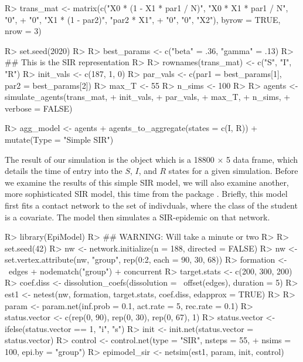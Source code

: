 \documentclass[
  shortnames]{jss}
\begin{document}
\begin{CodeChunk}
\begin{CodeInput}
R> trans_mat <- matrix(c("X0 * (1 - X1 * par1 / N)", "X0 * X1  * par1 / N", "0",
+                   "0", "X1 * (1 - par2)", "par2 * X1",
+                   "0", "0", "X2"), byrow = TRUE, nrow = 3)
\end{CodeInput}
\end{CodeChunk}

\begin{CodeChunk}
\begin{CodeInput}
R> set.seed(2020)
R> 
R> best_params <- c("beta" = .36, "gamma" = .13)
R> ## This is the SIR representation
R> 
R> rownames(trans_mat) <- c("S", "I", "R")
R> init_vals <- c(187, 1, 0)
R> par_vals <- c(par1 = best_params[1], par2 = best_params[2])
R> max_T <- 55
R> n_sims <- 100
R> 
R> agents <- simulate_agents(trans_mat,
+                        init_vals,
+                        par_vals,
+                        max_T,
+                        n_sims,
+                        verbose = FALSE)
\end{CodeInput}
\end{CodeChunk}

\begin{CodeChunk}
\begin{CodeInput}
R> agg_model <- agents %
+   agents_to_aggregate(states = c(I, R)) %
+   mutate(Type = "Simple SIR")
\end{CodeInput}
\end{CodeChunk}

The result of our simulation is the object  which is a
18800 \(\times\) 5 data frame, which details the time of entry into the
\(S\), \(I\), and \(R\) states for a given simulation. Before we examine
the results of this simple SIR model, we will also examine another, more
sophisticated SIR model, this time from the package .
Briefly, this model first fits a contact network to the set of
indivduals, where the class of the student is a covariate. The model
then simulates a SIR-epidemic on that network.

\begin{CodeChunk}
\begin{CodeInput}
R> library(EpiModel)
R> ## WARNING:  Will take a minute or two
R> 
R> set.seed(42)
R> nw <- network.initialize(n = 188, directed = FALSE)
R> nw <- set.vertex.attribute(nw, "group", rep(0:2, each = 90, 30, 68))
R> formation <- ~edges + nodematch("group") + concurrent
R> target.stats <- c(200, 300, 200)
R> coef.diss <- dissolution_coefs(dissolution = ~offset(edges),  duration = 5)
R> est1 <- netest(nw, formation, target.stats, coef.diss, edapprox = TRUE)
R> 
R> param <- param.net(inf.prob = 0.1, act.rate = 5, rec.rate = 0.1)
R> status.vector <- c(rep(0, 90), rep(0, 30), rep(0, 67), 1)
R> status.vector <- ifelse(status.vector == 1, "i", "s")
R> init <- init.net(status.vector = status.vector)
R> control <- control.net(type = "SIR", nsteps = 55,
+                        nsims = 100, epi.by = "group")
R> epimodel_sir <- netsim(est1, param, init, control)
\end{CodeInput}
\end{CodeChunk}
\end{document}
